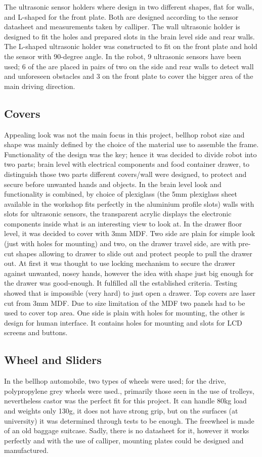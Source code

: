 \documentclass[11pt]{article}
\begin{document}
The ultrasonic sensor holders where design in two different shapes, flat for walls, and L-shaped for the front plate. Both are designed according to the sensor datasheet and measurements taken by calliper. The wall ultrasonic holder is designed to fit the holes and prepared slots in the brain level side and rear walls. The L-shaped ultrasonic holder was constructed to fit on the front plate and hold the sensor with 90-degree angle. In the robot, 9 ultrasonic sensors have been used; 6 of the are placed in pairs of two on the side and rear walls to detect wall and unforeseen obstacles and 3 on the front plate to cover the bigger area of the main driving direction.


\subsection*{Covers}
Appealing look was not the main focus in this project, bellhop robot size and shape was mainly defined by the choice of the material use to assemble the frame. Functionality of the design was the key; hence it was decided to divide robot into two parts; brain level with electrical components and food container drawer, to distinguish those two parts different covers/wall were designed, to protect and secure before unwanted hands and objects. In the brain level look and functionality is combined, by choice of plexiglass (the 5mm plexiglass sheet available in the workshop fits perfectly in the aluminium profile slots) walls with slots for ultrasonic sensors, the transparent acrylic displays the electronic components inside what is an interesting view to look at. In the drawer floor level, it was decided to cover with 3mm MDF. Two side are plain for simple look (just with holes for mounting) and two, on the drawer travel side, are with pre-cut shapes allowing to drawer to slide out and protect people to pull the drawer out. At first it was thought to use locking mechanism to secure the drawer against unwanted, nosey hands, however the idea with shape just big enough for the drawer was good-enough. It fulfilled all the established criteria. Testing showed that is impossible (very hard) to just open a drawer. Top covers are laser cut from 3mm MDF. Due to size limitation of the MDF two panels had to be used to cover top area. One side is plain with holes for mounting, the other is design for human interface. It contains holes for mounting and slots for LCD screens and buttons.


\subsection*{Wheel and Sliders}
In the bellhop automobile, two types of wheels were used; for the drive, polypropylene grey wheels were used., primarily those seen in the use of trolleys, nevertheless castor was the perfect fit for this project. It can handle 80kg load and weights only 130g, it does not have strong grip, but on the surfaces (at university) it was determined through tests to be enough. The freewheel is made of an old baggage suitcase. Sadly, there is no datasheet for it, however it works perfectly and with the use of calliper, mounting plates could be designed and manufactured.
\end{document}
